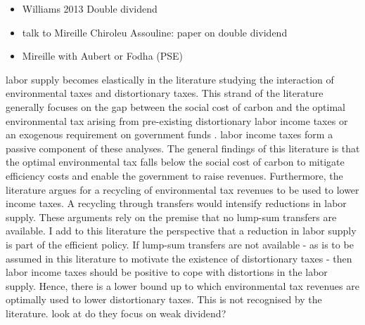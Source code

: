 \begin{itemize}
	\item Williams 2013 Double dividend 
	\item talk to Mireille Chiroleu Assouline: paper on double dividend
	\item Mireille with Aubert or Fodha (PSE)
\end{itemize}
labor supply becomes elastically in the literature studying the interaction of environmental taxes and distortionary taxes.  This strand of the literature generally focuses on the gap between the social cost of carbon and the optimal environmental tax arising from pre-existing distortionary labor income taxes or an exogenous requirement on government funds \citep{Bovenberg1997EnvironmentalGrowth,  Kaplow2012OPTIMALTAXATION, Jacobs2019RedistributionCurves, Barrage2019OptimalPolicy}. labor income taxes form a passive component of these analyses. 
The general findings of this literature is that the optimal environmental tax falls below the social cost of carbon to mitigate efficiency costs and enable the government to raise revenues. 
Furthermore, the literature argues for a recycling of environmental tax revenues to be used to lower income taxes. A recycling through transfers would intensify reductions in labor supply. These arguments rely on the premise that no lump-sum transfers are available. I add to this literature the perspective that a reduction in labor supply is part of the efficient policy. If lump-sum transfers are not available - as is to be assumed in this literature to motivate the existence of distortionary taxes - then labor income taxes should be positive to cope with distortions in the labor supply. Hence, there is a lower bound up to which environmental tax revenues are optimally used to lower distortionary taxes. This is not recognised by the literature.  \ar look at \cite{LansBovenberg1996OptimalAnalyses} do they focus on weak dividend?


